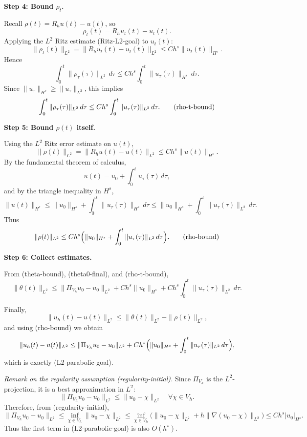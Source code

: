 \textbf{Step 4: Bound $\rho_t$.}

Recall $\rho(t) = R_h u(t) - u(t)$, so
\[
    \rho_t(t) = R_h u_t(t) - u_t(t).
\]
Applying the $L^2$ Ritz estimate (Ritz-L2-goal) to $u_t(t)$:
\[
    \|\rho_t(t)\|_{L^2}
    = \|R_h u_t(t) - u_t(t)\|_{L^2}
    \le C h^s \|u_t(t)\|_{H^s}.
\]
Hence
\[
    \int_0^t \|\rho_\tau(\tau)\|_{L^2}\,d\tau
    \le C h^s \int_0^t \|u_\tau(\tau)\|_{H^s}\,d\tau.
\]
Since $\|u_\tau\|_{H^s} \ge \|u_\tau\|_{L^2}$, this implies
\[
    \int_0^t \|\rho_\tau(\tau)\|_{L^2}\,d\tau
    \le C h^s \int_0^t \|u_\tau(\tau)\|_{L^2}\,d\tau.
    \tag{\text{rho-t-bound}}
\]

\textbf{Step 5: Bound $\rho(t)$ itself.}

Using the $L^2$ Ritz error estimate on $u(t)$,
\[
    \|\rho(t)\|_{L^2}
    = \|R_h u(t) - u(t)\|_{L^2}
    \le C h^s \|u(t)\|_{H^s}.
\]
By the fundamental theorem of calculus,
\[
    u(t) = u_0 + \int_0^t u_\tau(\tau)\,d\tau,
\]
and by the triangle inequality in $H^s$,
\[
    \|u(t)\|_{H^s}
    \le \|u_0\|_{H^s} + \int_0^t \|u_\tau(\tau)\|_{H^s}\,d\tau
    \le \|u_0\|_{H^s} + \int_0^t \|u_\tau(\tau)\|_{L^2}\,d\tau.
\]
Thus
\[
    \|\rho(t)\|_{L^2}
    \le C h^s\Bigl(\|u_0\|_{H^s} + \int_0^t \|u_\tau(\tau)\|_{L^2}\,d\tau\Bigr). \tag{\text{rho-bound}}
\]

\textbf{Step 6: Collect estimates.}

From (theta-bound), (theta0-final), and (rho-t-bound),
\[
    \|\theta(t)\|_{L^2}
    \le \|\Pi_{V_h}u_0 - u_0\|_{L^2}
    + C h^s\|u_0\|_{H^s}
    + C h^s \int_0^t \|u_\tau(\tau)\|_{L^2}\,d\tau.
\]

Finally,
\[
    \|u_h(t) - u(t)\|_{L^2}
    \le \|\theta(t)\|_{L^2} + \|\rho(t)\|_{L^2},
\]
and using (rho-bound) we obtain
\[
    \|u_h(t) - u(t)\|_{L^2}
    \le \|\Pi_{V_h}u_0 - u_0\|_{L^2}
    + C h^s\Bigl(\|u_0\|_{H^s}
    + \int_0^t \|u_\tau(\tau)\|_{L^2}\,d\tau\Bigr),
\]
which is exactly (L2-parabolic-goal).

\emph{Remark on the regularity assumption (regularity-initial).}
Since $\Pi_{V_h}$ is the $L^2$-projection, it is a best approximation in $L^2$:
\[
    \|\Pi_{V_h}u_0 - u_0\|_{L^2}
    \le \|u_0 - \chi\|_{L^2} \quad\forall\chi\in V_h.
\]
Therefore, from (regularity-initial),
\[
    \|\Pi_{V_h}u_0 - u_0\|_{L^2}
    \le \inf_{\chi\in V_h}\|u_0 - \chi\|_{L^2}
    \le \inf_{\chi\in V_h}
    \bigl( \|u_0 - \chi\|_{L^2}
    + h\|\nabla(u_0 - \chi)\|_{L^2}\bigr)
    \le C h^s |u_0|_{H^s}.
\]
Thus the first term in (L2-parabolic-goal) is also $O(h^s)$.
